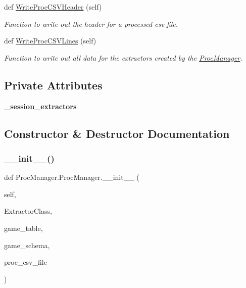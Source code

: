 \begin{DoxyCompactItemize}
def \mbox{\hyperlink{class_proc_manager_1_1_proc_manager_a2abf4bcc5684ffe4a68bc2398b7c5b50}{Write\+Proc\+C\+S\+V\+Header}} (self)
\begin{DoxyCompactList}\small\item\em Function to write out the header for a processed csv file. \end{DoxyCompactList}\item 
def \mbox{\hyperlink{class_proc_manager_1_1_proc_manager_aed7e5345016adee275b0e3415b420b66}{Write\+Proc\+C\+S\+V\+Lines}} (self)
\begin{DoxyCompactList}\small\item\em Function to write out all data for the extractors created by the \mbox{\hyperlink{class_proc_manager_1_1_proc_manager}{Proc\+Manager}}. \end{DoxyCompactList}\end{DoxyCompactItemize}
\subsection*{Private Attributes}
\begin{DoxyCompactItemize}
\item 
\mbox{\label{class_proc_manager_1_1_proc_manager_aec97cec2a93a9517820e86a918fe1d06}} 
{\bfseries \+\_\+session\+\_\+extractors}
\end{DoxyCompactItemize}


\subsection{Constructor \& Destructor Documentation}
\mbox{\label{class_proc_manager_1_1_proc_manager_a9fd37c5df3f1f4af41d9eccd8fe5f7fb}} 
\subsubsection{\texorpdfstring{\_\_init\_\_()}{\_\_init\_\_()}}
{\footnotesize\ttfamily def Proc\+Manager.\+Proc\+Manager.\+\_\+\+\_\+init\+\_\+\+\_\+ (\begin{DoxyParamCaption}\item[{}]{self,  }\item[{type}]{Extractor\+Class,  }\item[{\mbox{\hyperlink{class_game_table}{Game\+Table}}}]{game\+\_\+table,  }\item[{\mbox{\hyperlink{classschemas_1_1_schema_1_1_schema}{Schema}}}]{game\+\_\+schema,  }\item[{typing.\+I\+O.\+writable}]{proc\+\_\+csv\+\_\+file }\end{DoxyParamCaption})}



